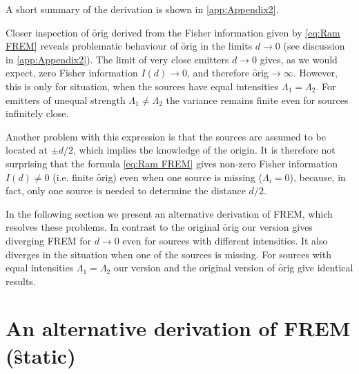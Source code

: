 A short summary of the derivation is shown in \autoref{app:Appendix2}. 

Closer inspection of \f{orig} derived from the Fisher information given by \autoref{eq:Ram FREM} reveals problematic behaviour of \f{orig} in the limits $d\rightarrow 0$ (see discussion in \autoref{app:Appendix2}). The limit of very close emitters $d\rightarrow0$ gives, as we would expect, zero Fisher information $I(d)\rightarrow0$, and therefore \f{orig}$\rightarrow\infty$. However, this is only for situation, when the sources have equal intensities $\Lambda_1=\Lambda_2$. For emitters of unequal strength $\Lambda_1\neq\Lambda_2$ the variance remains finite even for sources infinitely close. 

Another problem with this expression is that the sources are assumed to be located at $\pm d/2$, which implies the knowledge of the origin. It is therefore not surprising that the formula \autoref{eq:Ram FREM} gives non-zero Fisher information $I(d)\neq0$ (i.e. finite \f{orig}) even when one source is missing ($\Lambda_i=0$), because, in fact, only one source is needed to determine the distance $d/2$. 

In the following section we present an alternative derivation of FREM, which resolves these problems. In contrast to the original \f{orig} our version gives diverging FREM for $d\rightarrow0$ even for sources with different intensities. It also diverges in the situation when one of the sources is missing. For sources with equal intensities $\Lambda_1=\Lambda_2$ our version and the original version of \f{orig} give identical results. 


\section{An alternative derivation of FREM (\f{static})\label{sub:An-alternative-derivation-FREM}} 
 
